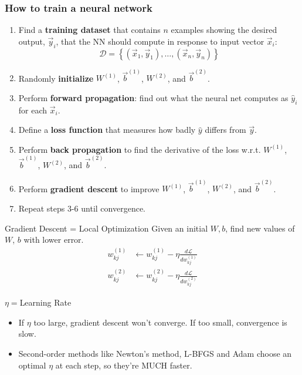 \documentclass{beamer}
\begin{document}
\begin{frame}
  \frametitle{How to train a neural network}
  \begin{enumerate}
  \item Find a {\bf training dataset} that contains $n$ examples showing the
    desired output, $\vec{y}_i$, that the NN should compute in
    response to input vector $\vec{x}_i$:
    \[
    {\mathcal D}=\left\{(\vec{x}_1,\vec{y}_1),\ldots,(\vec{x}_n,\vec{y}_n)\right\}
    \]
    \item Randomly {\bf initialize} $W^{(1)}$,
      $\vec{b}^{(1)}$, $W^{(2)}$, and $\vec{b}^{(2)}$.
    \item Perform {\bf forward propagation}: find out what the neural
      net computes as $\hat{y}_i$ for each $\vec{x}_i$.
    \item Define a {\bf loss function} that measures
      how badly $\hat{y}$ differs from $\vec{y}$.
    \item Perform {\bf back propagation} to find the derivative of the loss w.r.t.  $W^{(1)}$,
      $\vec{b}^{(1)}$, $W^{(2)}$, and $\vec{b}^{(2)}$.
    \item Perform {\bf gradient descent} to improve  $W^{(1)}$,
      $\vec{b}^{(1)}$, $W^{(2)}$, and $\vec{b}^{(2)}$.
    \item Repeat steps 3-6 until convergence.
  \end{enumerate}
\end{frame}

\begin{frame}
\begin{block}{Gradient Descent = Local Optimization}
  Given an initial $W,b$, find new values of $W$, $b$ with lower error.
  \begin{align*}
    w_{kj}^{(1)} &\leftarrow w_{kj}^{(1)}-\eta\frac{d{\mathcal L}}{d w_{kj}^{(1)}}\\
    w_{kj}^{(2)} &\leftarrow w_{kj}^{(2)}-\eta\frac{d{\mathcal L}}{d w_{kj}^{(2)}}
  \end{align*}
\end{block}
\begin{block}{$\eta=$Learning Rate}
    \begin{itemize}
      \item If $\eta$ too large, gradient descent won't converge. If
        too small, convergence is slow.
      \item Second-order methods like Newton's method, L-BFGS and Adam choose an optimal $\eta$
        at each step, so they're MUCH faster.
    \end{itemize}
\end{block}
\end{frame}
\end{document}
